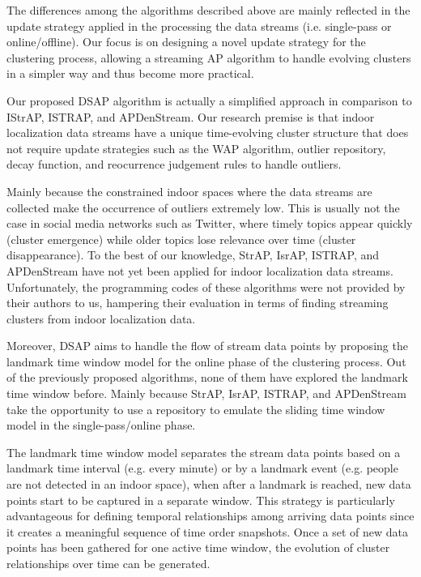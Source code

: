 The differences among the algorithms described above are mainly reflected in the update strategy applied in the processing the data streams (i.e. single-pass or online/offline). Our focus is on designing a novel update strategy for the clustering process, allowing a streaming AP algorithm to handle evolving clusters in a simpler way and thus become more practical. 

Our proposed DSAP algorithm is actually a simplified approach in comparison to IStrAP, ISTRAP, and APDenStream. Our research premise is that indoor localization data streams have a unique time-evolving cluster structure that does not require update strategies such as the WAP algorithm, outlier repository, decay function, and reocurrence judgement rules to handle outliers. 

Mainly because the constrained indoor spaces where the data streams are collected make the occurrence of outliers extremely low. This is usually not the case in social media networks such as Twitter, where timely topics appear quickly (cluster emergence) while older topics lose relevance over time (cluster disappearance). To the best of our knowledge, StrAP, IsrAP, ISTRAP, and APDenStream have not yet been applied for indoor localization data streams. Unfortunately, the programming codes of these algorithms were not provided by their authors to us, hampering their evaluation in terms of finding streaming clusters from indoor localization data.

Moreover, DSAP aims to handle the flow of stream data points by proposing the landmark time window model for the online phase of the clustering process. Out of the previously proposed algorithms, none of them have explored the landmark time window before. Mainly because StrAP, IsrAP, ISTRAP, and APDenStream take the opportunity to use a repository to emulate the sliding time window model in the single-pass/online phase. 

The landmark time window model separates the stream data points based on a landmark time interval (e.g. every minute) or by a landmark event (e.g. people are not detected in an indoor space), when after a landmark is reached, new data points start to be captured in a separate window. This strategy is particularly advantageous for defining temporal relationships among arriving data points since it creates a meaningful sequence of time order snapshots. Once a set of new data points has been gathered for one active time window, the evolution of cluster relationships over time can be generated. 

